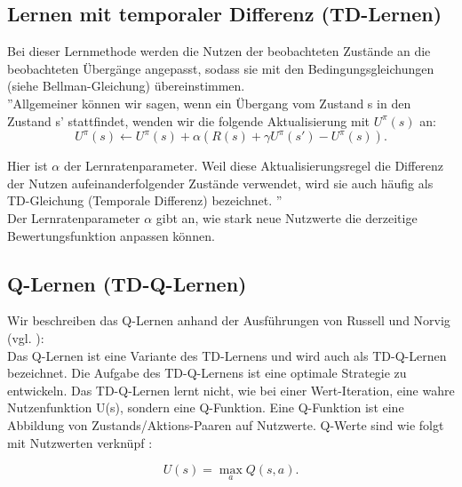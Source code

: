\subsection{Lernen mit temporaler Differenz (TD-Lernen)}
\label{subsec:Lernen mit temporaler Differenz}
Bei dieser Lernmethode werden die Nutzen der beobachteten Zustände an die beobachteten Übergänge angepasst, sodass sie mit den Bedingungsgleichungen (siehe Bellman-Gleichung) übereinstimmen. \\

''Allgemeiner können wir sagen, wenn ein Übergang vom Zustand s in den Zustand s' stattfindet, wenden wir die folgende Aktualisierung mit $U^\pi(s)$ an:\\
\begin{equation}
\label{eq:Aktualisierungsgleichung temporale Differenz}
U^\pi(s) \leftarrow U^\pi(s) + \alpha(R(s) + \gamma U^\pi(s') - U^\pi(s)).
\end{equation}

Hier ist $\alpha$ der Lernratenparameter. Weil diese Aktualisierungsregel die Differenz der Nutzen aufeinanderfolgender Zustände verwendet, wird sie auch häufig als TD-Gleichung (Temporale Differenz) bezeichnet. \cite[966\psq]{Russell}'' \\ 

Der Lernratenparameter $\alpha$ gibt an, wie stark neue Nutzwerte die derzeitige Bewertungsfunktion anpassen können. 

\subsection{Q-Lernen (TD-Q-Lernen)}
\label{subsec:Q-Lernen}
Wir beschreiben das Q-Lernen anhand der Ausführungen von Russell und Norvig (vgl. \cite[973 \psq]{Russell}): \\

Das Q-Lernen ist eine Variante des TD-Lernens und wird auch als TD-Q-Lernen bezeichnet. Die Aufgabe des TD-Q-Lernens ist eine optimale Strategie zu entwickeln. Das TD-Q-Lernen lernt nicht, wie bei einer Wert-Iteration, eine wahre Nutzenfunktion U(s), sondern eine Q-Funktion. Eine Q-Funktion ist eine Abbildung von Zustands/Aktions-Paaren auf Nutzwerte. Q-Werte sind wie folgt mit Nutzwerten verknüpf \cite[974]{Russell}:

\begin{equation}
\label{eq:Nutzenwerte und Q-Werte}
U(s) = \max_a Q(s,a).
\end{equation}

\newpage

